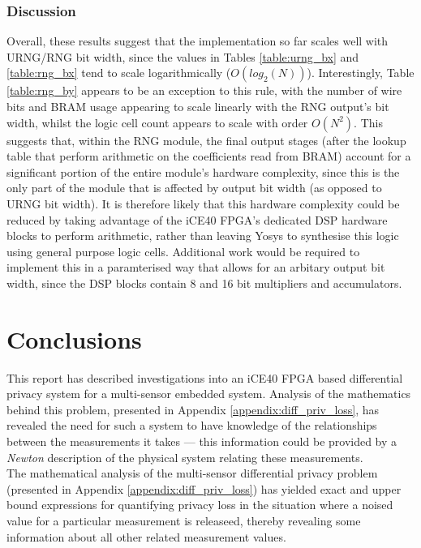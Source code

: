 \documentclass[12pt]{article}
\begin{document}
    \subsubsection{Discussion}
      Overall, these results suggest that the implementation so far scales well with URNG/RNG bit width, since the values in Tables \ref{table:urng_bx} and \ref{table:rng_bx} tend to scale logarithmically ($O(log_2(N))$). Interestingly, Table \ref{table:rng_by} appears to be an exception to this rule, with the number of wire bits and BRAM usage appearing to scale linearly with the RNG output's bit width, whilst the logic cell count appears to scale with order $O(N^2)$. This suggests that, within the RNG module, the final output stages (after the lookup table that perform arithmetic on the coefficients read from BRAM) account for a significant portion of the entire module's hardware complexity, since this is the only part of the module that is affected by output bit width (as opposed to URNG bit width). It is therefore likely that this hardware complexity could be reduced by taking advantage of the iCE40 FPGA's dedicated DSP hardware blocks to perform arithmetic, rather than leaving Yosys to synthesise this logic using general purpose logic cells. Additional work would be required to implement this in a paramterised way that allows for an arbitary output bit width, since the DSP blocks contain 8 and 16 bit multipliers and accumulators.
\newpage

%
%

\section{Conclusions}
  This report has described investigations into an iCE40 FPGA based differential privacy system for a multi-sensor embedded system. Analysis of the mathematics behind this problem, presented in Appendix \ref{appendix:diff_priv_loss}, has revealed the need for such a system to have knowledge of the relationships between the measurements it takes --- this information could be provided by a \textit{Newton} description of the physical system relating these measurements.\\

  The mathematical analysis of the multi-sensor differential privacy problem (presented in Appendix \ref{appendix:diff_priv_loss}) has yielded exact and upper bound expressions for quantifying privacy loss in the situation where a noised value for a particular measurement is releaseed, thereby revealing some information about all other related measurement values.\\
\end{document}
